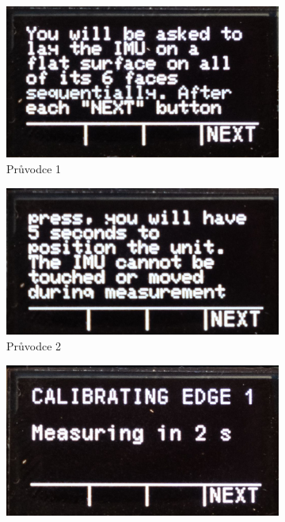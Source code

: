 \begin{figure}[h]
     \centering
     \begin{subfigure}[b]{0.24\textwidth}
         \centering
         \includegraphics[width=\textwidth]{obrazky/menuCAL1}
         \caption{Průvodce 1}     
     \end{subfigure}
     \hfill
     \centering
     \begin{subfigure}[b]{0.24\textwidth}
         \centering
         \includegraphics[width=\textwidth]{obrazky/menuCAL2}
         \caption{Průvodce 2}   
     \end{subfigure}
     \hfill
          \centering
     \begin{subfigure}[b]{0.24\textwidth}
         \centering
         \includegraphics[width=\textwidth]{obrazky/menuCAL3}

\end{subfigure}
\end{figure}
